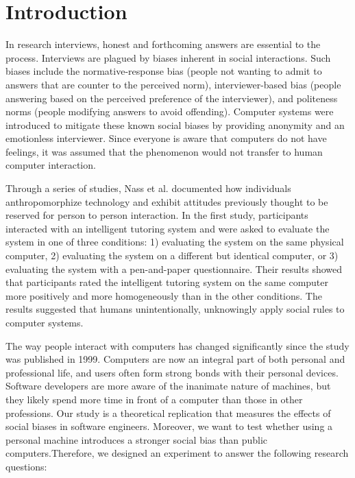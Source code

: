 \documentclass{sig-alternate-05-2015}
\begin{document}

%
%

\section{Introduction}
In research interviews, honest and forthcoming answers are essential to the process. Interviews are plagued by biases inherent in social interactions. Such biases include the normative-response bias (people not wanting to admit to answers that are counter to the perceived norm), interviewer-based bias (people answering based on the perceived preference of the interviewer), and politeness norms (people modifying answers to avoid offending). Computer systems were introduced to mitigate these known social biases by providing anonymity and an emotionless interviewer.  Since everyone is aware that computers do not have feelings, it was assumed that the phenomenon would not transfer to human computer interaction. 

Through a series of studies, Nass et al. documented how individuals anthropomorphize technology and exhibit attitudes previously thought to be reserved for person to person interaction\cite{nass1999people}\cite{reeves1996people}.  In the first study, participants interacted with an intelligent tutoring system and were asked to evaluate the system in one of three conditions: 1) evaluating the system on the same physical computer, 2) evaluating the system on a different but identical computer, or 3) evaluating the system with a pen-and-paper questionnaire. Their results showed that participants rated the intelligent tutoring system on the same computer more positively and more homogeneously than in the other conditions. The results suggested that humans unintentionally, unknowingly apply social rules to computer systems.  


The way people interact with computers has changed significantly since the study was published  in 1999.  Computers are now an integral part of both personal and professional life, and users often form strong bonds with their personal devices.  Software developers are more aware of the inanimate nature of machines, but they likely spend more time in front of a computer than those in other professions. Our study is a theoretical replication that measures the effects of social biases in software engineers.  Moreover, we want to test whether using a personal machine introduces a stronger social bias than public computers.Therefore, we designed an experiment to answer the following research questions:\\
\end{document}
